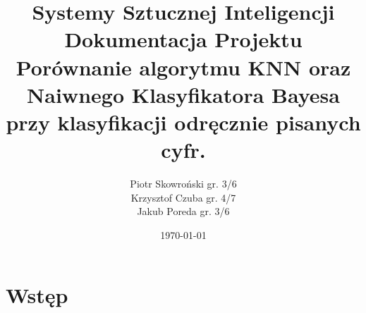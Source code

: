 \documentclass[12pt,a4paper]{article}
\begin{document}
\title{Systemy Sztucznej Inteligencji\\\small
	{Dokumentacja Projektu\\Porównanie algorytmu KNN oraz
		Naiwnego Klasyfikatora Bayesa przy klasyfikacji odręcznie pisanych cyfr.}}
\author{Piotr Skowroński gr. 3/6\\Krzysztof Czuba gr. 4/7\\Jakub Poreda gr. 3/6}
\date{\today}

\maketitle

\newpage
\tableofcontents

\newpage
\section{Wstęp}
\end{document}
